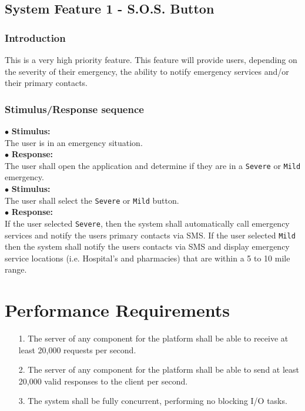 \documentclass{scrreprt}
\begin{document}
\subsection{System Feature 1 - S.O.S. Button}
\subsubsection{Introduction}
This is a very high priority feature. This feature will provide users, depending on the severity of their emergency, the ability to notify emergency services and/or their primary contacts.


\subsubsection{Stimulus/Response sequence}
\vspace{5mm}
	$\bullet$ \textbf{Stimulus:} \\ \hspace{5mm} The user is in an emergency situation. \\
	$\bullet$ \textbf{Response:} \\ \hspace{5mm} The user shall open the application and determine if they are in a \texttt{Severe} or \texttt{Mild} emergency.
\vspace{5mm}\\
	\hspace{-4.75mm} $\bullet$ \textbf{Stimulus:} \\ \hspace{5mm} The user shall select the \texttt{Severe} or \texttt{Mild} button.\\
	$\bullet$ \textbf{Response:} \\ \hspace{5mm} If the user selected \texttt{Severe}, then the system shall automatically call emergency services and notify the users primary contacts via SMS. If the user selected \texttt{Mild} then the system shall notify the users contacts via SMS and display emergency service locations (i.e. Hospital's and pharmacies) that are within a 5 to 10 mile range. \\



\section{Performance Requirements}
\begin{enumerate}
	\item[1.] The server of any component for the platform shall be able to receive at least 20,000 requests per second.
	\item[2.] The server of any component for the platform shall be able to send at least 20,000 valid responses to the client per second.
	\item[3.] The system shall be fully concurrent, performing no blocking I/O tasks.
\end{enumerate}
\end{document}
